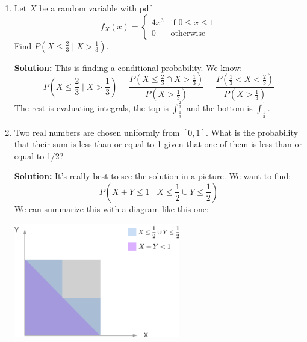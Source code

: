 \documentclass{article}
\newenvironment{solution}{

            \color{blue} \smallskip \textbf{Solution:}}{}
\begin{document}
\begin{enumerate}
\begin{enumerate}
\begin{solution}
            To find $var[X] = E[X^2] - E[X]^2$, we first find $E[X^2]$: \[
                E[X^2] = \int_{-1}^{1} x^2 \cdot \frac{3}{2} x^2 dx = \frac{3}{2} \left[\frac{1}{5} x^5\right]^{1}_{-1} = \frac{3}{5}
            \]
            So our variance is just $\frac{3}{5}$.
            \end{solution}
            \item Find $P(X \leq \frac{1}{2})$.
            \begin{solution}
            We need to find $\int_{-\infty}^{\frac{1}{2}} f_X(x) dx$: \[
                P(X \leq \frac{1}{2}) = \int_{-1}^{\frac{1}{2}} \frac{3}{2}x^2 dx = \frac{3}{2} \left[\frac{1}{3}x^3\right]^{\frac{1}{2}}_{-1} = \frac{9}{16}
            \]
            \end{solution}
        \end{enumerate}
        \item Let $X$ be a random variable with pdf \[
            f_X(x) = \begin{cases}
                4x^3 & \text{if } 0 \leq x \leq 1 \\
                0 & \text{otherwise}
            \end{cases}
        \]
        Find $P(X \leq \frac{2}{3} \mid X > \frac{1}{3})$.
        \begin{solution}
            This is finding a conditional probability. We know: \[
                P(X \leq \frac{2}{3} \mid X > \frac{1}{3}) = \frac{P(X \leq \frac{2}{3} \cap X > \frac{1}{3})}{P(X > \frac{1}{3})} = \frac{P(\frac{1}{3} < X < \frac{2}{3})}{P(X > \frac{1}{3})}
            \]
            The rest is evaluating integrals, the top is $\int_{\frac{1}{3}}^{\frac{2}{3}}$ and the bottom is $\int_{\frac{1}{3}}^1$.
        \end{solution}
        \item Two real numbers are chosen uniformly from $[0,1]$. What is the probability that their sum is less than or equal to 1 given that one of them is less than or equal to 1/2?
        \begin{solution}
            It's really best to see the solution in a picture. We want to find: \[
                P(X + Y \leq 1 \mid X \leq \frac{1}{2} \cup Y \leq \frac{1}{2})
            \]
            We can summarize this with a diagram like this one:

            \includegraphics[height=5cm]{conditional-figure}


\end{solution}
\end{enumerate}
\end{document}
